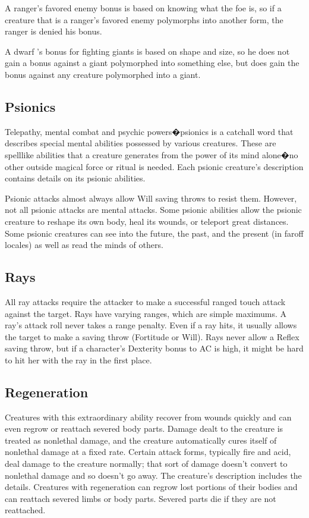 A ranger's favored enemy bonus is based on knowing what the foe is, so if a creature that is a ranger's favored enemy polymorphs into another form, the ranger is denied his bonus.

A dwarf 's bonus for fighting giants is based on shape and size, so he does not gain a bonus against a giant polymorphed into something else, but does gain the bonus against any creature polymorphed into a giant.

\subsection{Psionics}

Telepathy, mental combat and psychic powers�psionics is a catchall word that describes special mental abilities possessed by various creatures. These are spell\textendash like abilities that a creature generates from the power of its mind alone�no other outside magical force or ritual is needed. Each psionic creature's description contains details on its psionic abilities.

Psionic attacks almost always allow Will saving throws to resist them. However, not all psionic attacks are mental attacks. Some psionic abilities allow the psionic creature to reshape its own body, heal its wounds, or teleport great distances. Some psionic creatures can see into the future, the past, and the present (in far\textendash off locales) as well as read the minds of others. 

\subsection{Rays}

All ray attacks require the attacker to make a successful ranged touch attack against the target. Rays have varying ranges, which are simple maximums. A ray's attack roll never takes a range penalty. Even if a ray hits, it usually allows the target to make a saving throw (Fortitude or Will). Rays never allow a Reflex saving throw, but if a character's Dexterity bonus to AC is high, it might be hard to hit her with the ray in the first place.

\subsection{Regeneration}

Creatures with this extraordinary ability recover from wounds quickly and can even regrow or reattach severed body parts. Damage dealt to the creature is treated as nonlethal damage, and the creature automatically cures itself of nonlethal damage at a fixed rate.
Certain attack forms, typically fire and acid, deal damage to the creature normally; that sort of damage doesn't convert to nonlethal damage and so doesn't go away. The creature's description includes the details.
Creatures with regeneration can regrow lost portions of their bodies and can reattach severed limbs or body parts. Severed parts die if they are not reattached.

